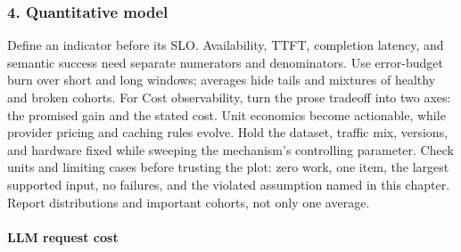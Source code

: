 \subsubsection*{4. Quantitative model}
Define an indicator before its SLO. Availability, TTFT, completion latency, and semantic success need separate numerators and denominators. Use error-budget burn over short and long windows; averages hide tails and mixtures of healthy and broken cohorts.
For Cost observability, turn the prose tradeoff into two axes: the promised gain and the stated cost. Unit economics become actionable, while provider pricing and caching rules evolve. Hold the dataset, traffic mix, versions, and hardware fixed while sweeping the mechanism's controlling parameter.
Check units and limiting cases before trusting the plot: zero work, one item, the largest supported input, no failures, and the violated assumption named in this chapter. Report distributions and important cohorts, not only one average.
\paragraph{LLM request cost}
